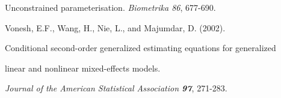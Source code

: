 \documentclass[12pt]{article}
\begin{document}
\begin{description}
Unconstrained parameterisation. {\it Biometrika 86}, 677-690. 



\item  Vonesh, E.F., Wang, H., Nie, L., and Majumdar, D. (2002). 

  Conditional second-order generalized estimating equations for generalized 

  linear and nonlinear mixed-effects models. 

 {\it Journal of the American Statistical Association {\bf 97}}, 271-283.





\end{description}
\end{document}
